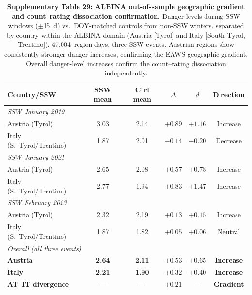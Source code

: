 \documentclass[11pt,letterpaper]{article}
\begin{document}
\begin{table}[htbp]
\caption{\textbf{Supplementary Table 29: ALBINA out-of-sample geographic gradient and count--rating dissociation confirmation.}
Danger levels during SSW windows ($\pm$15~d) vs.\ DOY-matched controls from non-SSW winters, separated by country within the ALBINA domain (Austria [Tyrol] and Italy [South Tyrol, Trentino]). 47,004~region-days, three SSW events. Austrian regions show consistently stronger danger increases, confirming the EAWS geographic gradient. Overall danger-level increases confirm the count--rating dissociation independently.}
\label{tab:albina_expanded}
\small
\begin{tabular}{lccccc}
\toprule
Country/SSW & SSW mean & Ctrl mean & $\Delta$ & $d$ & Direction \\
\midrule
\multicolumn{6}{l}{\textit{SSW January 2019}} \\
Austria (Tyrol) & 3.03 & 2.14 & $+0.89$ & $+1.16$ & Increase \\
Italy (S.\ Tyrol/Trentino) & 1.87 & 2.01 & $-0.14$ & $-0.20$ & Decrease \\
\midrule
\multicolumn{6}{l}{\textit{SSW January 2021}} \\
Austria (Tyrol) & 2.65 & 2.08 & $+0.57$ & $+0.78$ & Increase \\
Italy (S.\ Tyrol/Trentino) & 2.77 & 1.94 & $+0.83$ & $+1.47$ & Increase \\
\midrule
\multicolumn{6}{l}{\textit{SSW February 2023}} \\
Austria (Tyrol) & 2.32 & 2.19 & $+0.13$ & $+0.15$ & Increase \\
Italy (S.\ Tyrol/Trentino) & 1.87 & 1.82 & $+0.05$ & $+0.06$ & Neutral \\
\midrule
\multicolumn{6}{l}{\textit{Overall (all three events)}} \\
\textbf{Austria} & \textbf{2.64} & \textbf{2.11} & $\mathbf{+0.53}$ & $\mathbf{+0.65}$ & \textbf{Increase} \\
\textbf{Italy} & \textbf{2.21} & \textbf{1.90} & $\mathbf{+0.32}$ & $\mathbf{+0.40}$ & \textbf{Increase} \\
\midrule
\textbf{AT--IT divergence} & --- & --- & $\mathbf{+0.21}$ & --- & \textbf{Gradient} \\
\bottomrule
\end{tabular}
\end{table}
\end{document}
